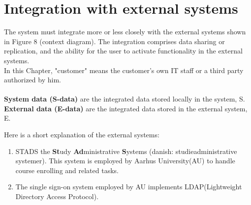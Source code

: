 \documentclass[Main]{subfiles}
\begin{document}
\chapter{Integration with external systems}\label{cha:F}

The system must integrate more or less closely with the external systems shown in Figure 8 (context diagram). The integration comprises data sharing or replication, and the ability for the user to activate functionality in the external systems. 
\\
In this Chapter, "customer" means the customer's own IT staff or a third party authorized by him.
\\
\\
\textbf{System data (S-data)} are the integrated data stored locally in the system, S.\\
\textbf{External data (E-data)} are the integrated data stored in the external system, E.

Here is a short explanation of the external systems:

\begin{enumerate}
\item STADS the \textbf{St}udy \textbf{Ad}ministrative \textbf{S}ystems (danish: studieadministrative systemer). This system is employed by Aarhus University(AU) to handle course enrolling and related tasks.
\item The single sign-on system employed by AU  implements LDAP(Lightweight Directory Access Protocol).
\end{enumerate}



%

\end{document}
